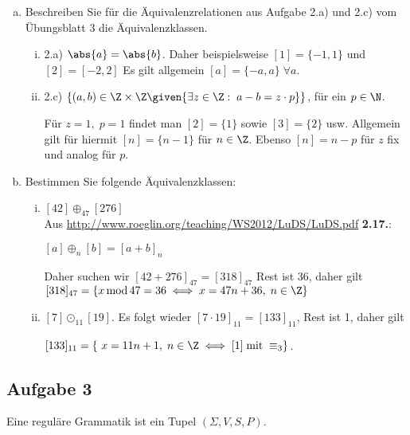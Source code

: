   \begin{enumerate}[a)]
    \item Beschreiben Sie für die Äquivalenzrelationen aus Aufgabe 2.a) und 2.c) vom Übungsblatt 3 die Äquivalenzklassen.
      \begin{enumerate}[i)]
        \item 2.a) $\abs{a} = \abs{b}$. Daher beispielsweise $[1] = \{-1, 1\}$ und $[2] = [-2, 2]$ Es gilt allgemein $[a] = \{ -a, a \} \; \forall a$.

        \item 2.c) $\{  (a,b) \in \Z \times \Z \given {\exists z \in \Z: \; a-b = z \cdot p}  \}$, für ein $p \in \N$.

        Für $z = 1, \; p=1$ findet man $[2] = \{1\}$ sowie $[3] = \{2\}$ usw. Allgemein gilt für hiermit $[n] = \{n-1\}$ für $n \in \Z$. Ebenso $[n] = n-p$ für $z$ fix und analog für $p$.


      \end{enumerate}


    \item Bestimmen Sie folgende Äquivalenzklassen:

    \begin{enumerate}[i)]
      \item $[42] \oplus_{47} [276]$\\
      Aus \url{http://www.roeglin.org/teaching/WS2012/LuDS/LuDS.pdf}{ \textbf{2.17.}}:

      \begin{definition}$[a] \oplus_{n} [b] = [a + b]_n$
      \end{definition}
      Daher suchen wir $[42 + 276]_{47} = [318]_{47}$ Rest ist 36, daher gilt $[318]_{47} = \{ x \, \text{mod} \, 47 = 36 \iff x = 47n + 36, \; n \in \Z  \} $

      \item $ [7] \odot_{11} [19] $. Es folgt wieder $ [7 \cdot 19]_{11} = [133]_{11} $, Rest ist 1, daher gilt

      $ [133]_{11} = \{\ x = 11n + 1, \; n \in \Z \iff [1] \; \text{mit} \; \equiv_{3} \} $.



    \end{enumerate}
  \end{enumerate}

  \subsection*{Aufgabe 3}
    Eine reguläre Grammatik ist ein Tupel $(\Sigma, V, S, P)$.

